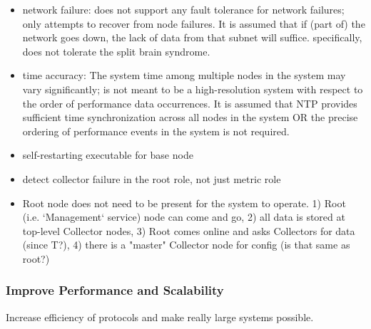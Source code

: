 \begin{itemize}

\item network failure: \dcamp does not support any fault tolerance for network failures; \dcamp only attempts to recover
from node failures. It is assumed that if (part of) the network goes down, the lack of data from that subnet will
suffice. specifically, \dcamp does not tolerate the split brain syndrome\cite{needed}.

\item time accuracy: The system time among multiple nodes in the system may vary significantly; \dcamp is not meant to
be a high-resolution system with respect to the order of performance data occurrences. It is assumed that NTP provides
sufficient time synchronization across all nodes in the system OR the precise ordering of performance events in the
system is not required.

\item self-restarting executable for base node

\item detect collector failure in the root role, not just metric role

\item Root node does not need to be present for the system to operate. 1) Root (i.e. `Management` service) node can come
and go, 2) all data is stored at top-level Collector nodes, 3) Root comes online and asks Collectors for data (since
T?), 4) there is a "master" Collector node for config (is that same as root?)

\end{itemize}

\subsubsection{Improve Performance and Scalability}

Increase efficiency of protocols and make really large \dcamp systems possible.


